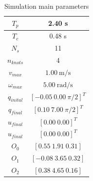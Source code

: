 \begin{table}[!h]
\caption {Simulation main parameters} \label{tab:s3param}
\begin{center}
\begin{tabular}{|c|c|}
\hline
$T_p$ & 2.40 s\\
\hline 
$T_c$ & 0.48 s\\
\hline 
$N_s$ & 11\\
\hline 
$n_{knots}$ & 4\\
\hline
$v_{max}$ & $1.00\ \mathrm{m/s}$\\
\hline
$\omega_{max}$ & $5.00\ \mathrm{rad/s}$\\
\hline
$q_{inital}$ & $[-0.05\ 0.00\ \pi/2]^T$\\
\hline
$q_{final}$ & $[0.10\ 7.00\ \pi/2]^T$\\
\hline
$u_{final}$ & $[0.00\ 0.00]^T$\\
\hline
$u_{final}$ & $[0.00\ 0.00]^T$\\
\hline
$O_0$ & $[0.55\ 1.91\ 0.31]$\\
\hline
$O_1$ & $[-0.08\ 3.65\ 0.32]$\\
\hline
$O_2$ & $[0.38\ 4.65\ 0.16]$\\
\hline
\end{tabular}
\end{center}
\end{table}

